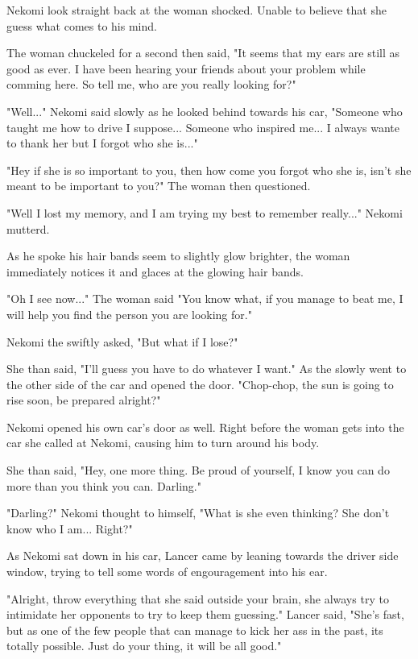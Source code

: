 Nekomi look straight back at the woman shocked. Unable to believe that she guess what comes to his mind.

The woman chuckeled for a second then said, "It seems that my ears are still as good as ever. I have been hearing your friends about your problem while comming here. So tell me, who are you really looking for?"

"Well..." Nekomi said slowly as he looked behind towards his car, "Someone who taught me how to drive I suppose... Someone who inspired me... I always wante to thank her but I forgot who she is..."

"Hey if she is so important to you, then how come you forgot who she is, isn't she meant to be important to you?" The woman then questioned.

"Well I lost my memory, and I am trying my best to remember really..." Nekomi mutterd.

As he spoke his hair bands seem to slightly glow brighter, the woman immediately notices it and glaces at the glowing hair bands.

"Oh I see now..." The woman said "You know what, if you manage to beat me, I will help you find the person you are looking for."

Nekomi the swiftly asked, "But what if I lose?"

She than said, "I'll guess you have to do whatever I want." As the slowly went to the other side of the car and opened the door. "Chop-chop, the sun is going to rise soon, be prepared alright?"

Nekomi opened his own car's door as well. Right before the woman gets into the car she called at Nekomi, causing him to turn around his body.

She than said, "Hey, one more thing. Be proud of yourself, I know you can do more than you think you can. Darling."

"Darling?" Nekomi thought to himself, "What is she even thinking? She don't know who I am... Right?"

As Nekomi sat down in his car, Lancer came by leaning towards the driver side window, trying to tell some words of engouragement into his ear.

"Alright, throw everything that she said outside your brain, she always try to intimidate her opponents to try to keep them guessing." Lancer said, "She's fast, but as one of the few people that can manage to kick her ass in the past, its totally possible. Just do your thing, it will be all good."

